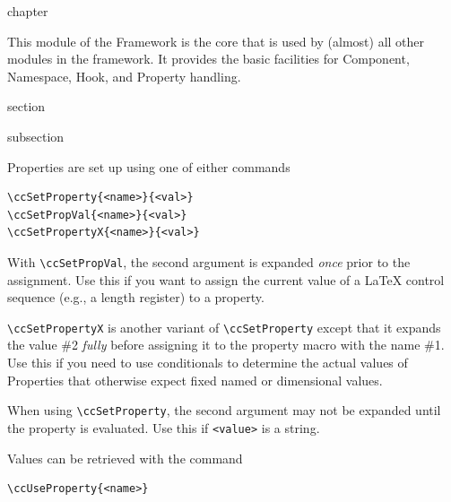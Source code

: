 \begin{Heading}[label=chap:common]{chapter}
\end{Heading}

This module of the {\CoCoTeX} Framework is the core
that is used by (almost) all other modules in the framework. It
provides the basic facilities for Component, Namespace, Hook, and
Property handling.

\begin{Heading}[label=sec:use_props]{section}
\end{Heading}

\begin{Heading}[label=sec:set_props]{subsection}
\end{Heading}

Properties are set up using one of either commands
\begin{lstlisting}[style=tex]
\ccSetProperty{<name>}{<val>}
\ccSetPropVal{<name>}{<val>}
\ccSetPropertyX{<name>}{<val>}
\end{lstlisting}
With
\lstinline{\ccSetPropVal}, the second argument is expanded \textit{once}
prior to the assignment. Use this if you want to assign the current
value of a {\LaTeX} control sequence (e.g., a length register) to a
property.

\lstinline{\ccSetPropertyX} is another variant of \lstinline{\ccSetProperty}
except that it expands the value \#2 \textit{fully} before assigning
it to the property macro with the name \#1.  Use this if you need to
use conditionals to determine the actual values of Properties that
otherwise expect fixed named or dimensional values.


When using \lstinline{\ccSetProperty}, the second argument may not be
expanded until the property is evaluated. Use this if
\lstinline{<value>} is a string.

Values can be retrieved with the command
\begin{lstlisting}[style=tex]
\ccUseProperty{<name>}
\end{lstlisting}

